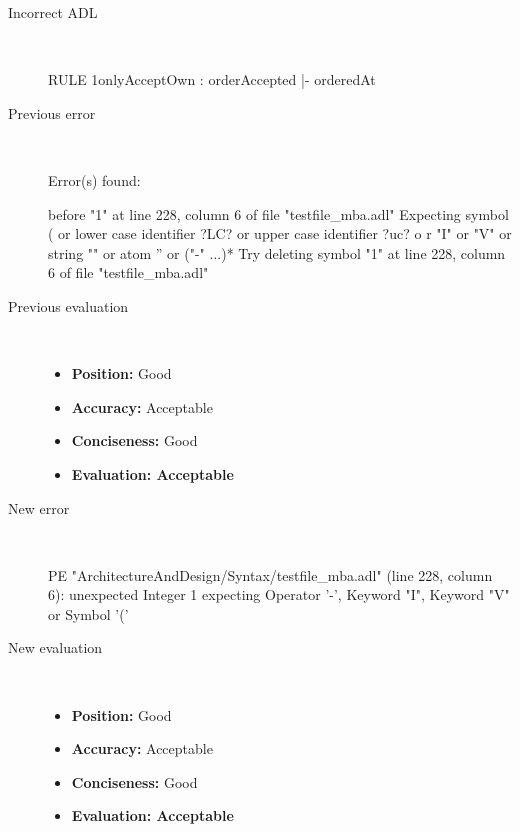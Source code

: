 \hrulefill

\begin{description}
  \item[Incorrect ADL]~\\
\begin{adl}
RULE 1onlyAcceptOwn : orderAccepted |- orderedAt\end{adl}
  \item[Previous error]~\\
\begin{haskell}
Error(s) found:

before "1" at line 228, column 6 of file "testfile_mba.adl"
Expecting symbol ( or lower case identifier ?LC? or upper case identifier ?uc? o
r "I" or "V" or string "" or atom '' or ("-" ...)*
Try deleting symbol "1" at line 228, column 6 of file "testfile_mba.adl"
\end{haskell}
  \item[Previous evaluation]~\\
    \begin{itemize}
    \item \textbf{Position:} Good
    \item \textbf{Accuracy:} Acceptable
    \item \textbf{Conciseness:} Good
    \item \textbf{Evaluation: Acceptable}
    \end{itemize}
  \item[New error]~\\
\begin{haskell}
PE "ArchitectureAndDesign/Syntax/testfile_mba.adl" (line 228, column 6):
unexpected Integer 1
expecting Operator '-', Keyword "I", Keyword "V" or Symbol '('\end{haskell}
  \item[New evaluation]~\\
    \begin{itemize}
    \item \textbf{Position:} Good
    \item \textbf{Accuracy:} Acceptable
    \item \textbf{Conciseness:} Good
    \item \textbf{Evaluation: Acceptable}
    \end{itemize}
  \end{description}

\hrulefill

